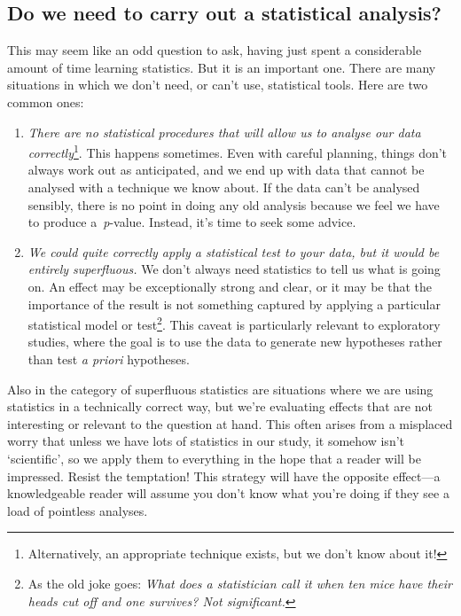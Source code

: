 \documentclass[
]{book}
\begin{document}
\hypertarget{do-we-need-to-carry-out-a-statistical-analysis}{%
\subsection{Do we need to carry out a statistical analysis?}\label{do-we-need-to-carry-out-a-statistical-analysis}}

This may seem like an odd question to ask, having just spent a considerable amount of time learning statistics. But it is an important one. There are many situations in which we don't need, or can't use, statistical tools. Here are two common ones:

\begin{enumerate}
\def\labelenumi{\arabic{enumi}.}
\item
  \emph{There are no statistical procedures that will allow us to analyse our data correctly}\footnote{Alternatively, an appropriate technique exists, but we don't know about it!}. This happens sometimes. Even with careful planning, things don't always work out as anticipated, and we end up with data that cannot be analysed with a technique we know about. If the data can't be analysed sensibly, there is no point in doing any old analysis because we feel we have to produce a~\emph{p}-value. Instead, it's time to seek some advice.
\item
  \emph{We could quite correctly apply a statistical test to your data, but it would be entirely superfluous.} We don't always need statistics to tell us what is going on. An effect may be exceptionally strong and clear, or it may be that the importance of the result is not something captured by applying a particular statistical model or test\footnote{As the old joke goes: \emph{What does a statistician call it when ten mice have their heads cut off and one survives? Not significant.}}. This caveat is particularly relevant to exploratory studies, where the goal is to use the data to generate new hypotheses rather than test \emph{a priori} hypotheses.
\end{enumerate}

Also in the category of superfluous statistics are situations where we are using statistics in a technically correct way, but we're evaluating effects that are not interesting or relevant to the question at hand. This often arises from a misplaced worry that unless we have lots of statistics in our study, it somehow isn't `scientific', so we apply them to everything in the hope that a reader will be impressed. Resist the temptation! This strategy will have the opposite effect---a knowledgeable reader will assume you don't know what you're doing if they see a load of pointless analyses.
\end{document}
